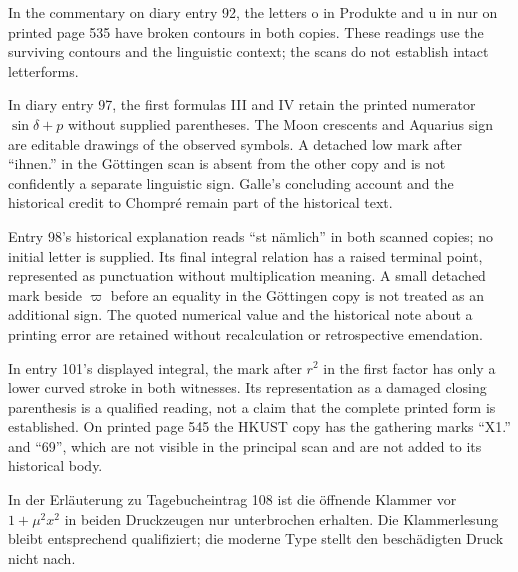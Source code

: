 In the commentary on diary entry 92, the letters o in Produkte and u in nur on printed page 535 have broken contours in both copies. These readings use the surviving contours and the linguistic context; the scans do not establish intact letterforms.

In diary entry 97, the first formulas III and IV retain the printed numerator \(\sin\delta+p\) without supplied parentheses. The Moon crescents and Aquarius sign are editable drawings of the observed symbols. A detached low mark after “ihnen.” in the Göttingen scan is absent from the other copy and is not confidently a separate linguistic sign. Galle’s concluding account and the historical credit to Chompré remain part of the historical text.

Entry 98’s historical explanation reads “st nämlich” in both scanned copies; no initial letter is supplied. Its final integral relation has a raised terminal point, represented as punctuation without multiplication meaning. A small detached mark beside \(\varpi\) before an equality in the Göttingen copy is not treated as an additional sign. The quoted numerical value and the historical note about a printing error are retained without recalculation or retrospective emendation.

In entry 101’s displayed integral, the mark after \(r^2\) in the first factor has only a lower curved stroke in both witnesses. Its representation as a damaged closing parenthesis is a qualified reading, not a claim that the complete printed form is established. On printed page 545 the HKUST copy has the gathering marks “X1.” and “69”, which are not visible in the principal scan and are not added to its historical body.

In der Erläuterung zu Tagebucheintrag 108 ist die öffnende Klammer vor \(1+\mu^2x^2\) in beiden Druckzeugen nur unterbrochen erhalten. Die Klammerlesung bleibt entsprechend qualifiziert; die moderne Type stellt den beschädigten Druck nicht nach.
